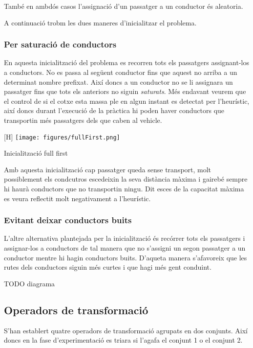 També en ambdós casos l'assignació d'un passatger a un conductor és aleatoria.

A continuació trobm les dues maneres d'inicialitzar el problema.

\subsubsection{Per saturació de conductors}
En aquesta inicialització del problema es recorren tots els passatgers assignant-los a conductors. No es passa
al següent conductor fins que aquest no arriba a un determinat nombre prefixat. Així doncs a un conductor no se
li assignara un passatger fins que tots els anteriors no siguin \emph{saturats}. Més endavant veurem
que el control de si el cotxe esta massa ple en algun instant es detectat per l'heurístic, així doncs
durant l'execució de la pràctica hi poden haver conductors que transportin més passatgers dels que
caben al vehicle.

\begin{center}[H]\label{maxCapaDepenentDeRuta}
 \texttt{[image: figures/fullFirst.png]}
 \caption{Inicialització full first}
\end{center}


Amb aquesta inicialització cap passatger queda sense transport, molt possiblement els condcutros escedeixin
la seva distància màxima i gairebé sempre hi haurà conductors que no transportin ningu.
Dit esces de la capacitat màxima es veura reflectit molt negativament a l'heurístic.


\subsubsection{Evitant deixar conductors buits}
L'altre alternativa plantejada per la inicialització és recórrer tots els passatgers i assignar-los a conductors
de tal manera que no s'assigni un segon passatger a un conductor mentre hi hagin conductors buits.
D'aqueta manera s'afavoreix que les rutes dels conductors siguin més curtes i que hagi més
gent conduint.

TODO diagrama

\subsection{Operadors de transformació}
S'han establert quatre operadors de transformació agrupats en dos conjunts. Així doncs en la fase d'experimentació
es triara si l'agafa el conjunt 1 o el conjunt 2.

